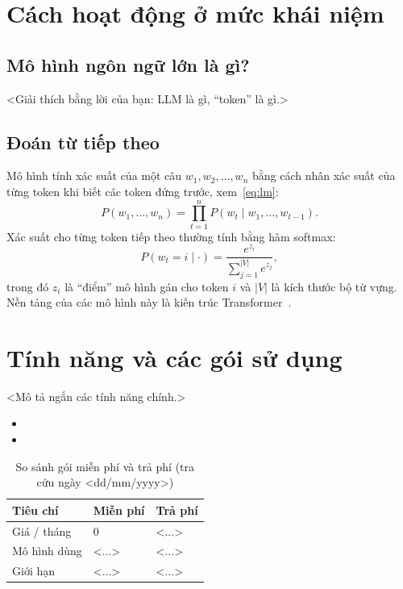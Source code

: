 \documentclass[12pt,a4paper]{article}
\begin{document}
\section{Cách hoạt động ở mức khái niệm}
\subsection{Mô hình ngôn ngữ lớn là gì?}
<Giải thích bằng lời của bạn: LLM là gì, ``token'' là gì.>

\subsection{Đoán từ tiếp theo}
Mô hình tính xác suất của một câu $w_1, w_2, \dots, w_n$ bằng cách nhân
xác suất của từng token khi biết các token đứng trước, xem~\eqref{eq:lm}:
\begin{equation}
  P(w_1,\dots,w_n) = \prod_{t=1}^{n} P(w_t \mid w_1,\dots,w_{t-1}).
  \label{eq:lm}
\end{equation}
Xác suất cho từng token tiếp theo thường tính bằng hàm softmax:
\begin{equation}
  P(w_t = i \mid \cdot) = \frac{e^{z_i}}{\sum_{j=1}^{|V|} e^{z_j}},
  \label{eq:softmax}
\end{equation}
trong đó $z_i$ là ``điểm'' mô hình gán cho token $i$ và $|V|$ là kích
thước bộ từ vựng. Nền tảng của các mô hình này là kiến trúc
Transformer~\cite{vaswani2017}.   %

\section{Tính năng và các gói sử dụng}
<Mô tả ngắn các tính năng chính.>
\begin{itemize}
  \item <Tính năng 1>
  \item <Tính năng 2>
\end{itemize}

\begin{table}[H]
  \centering
  \caption{So sánh gói miễn phí và trả phí (tra cứu ngày <dd/mm/yyyy>)}
  \label{tab:goi}
  \begin{tabular}{lll}
    \toprule
    Tiêu chí & Miễn phí & Trả phí \\
    \midrule
    Giá / tháng    & 0 & <...> \\
    Mô hình dùng   & <...> & <...> \\
    Giới hạn       & <...> & <...> \\
    \bottomrule
  \end{tabular}
\end{table}
\end{document}
